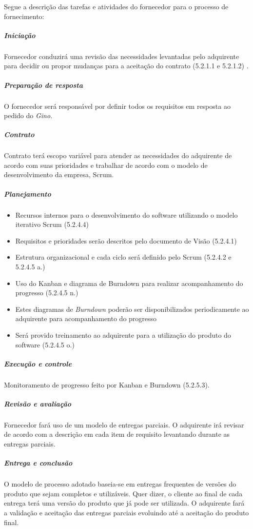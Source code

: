 Segue a descrição das tarefas e atividades do fornecedor para o processo de fornecimento:


\subparagraph{Iniciação}

Fornecedor conduzirá uma revisão das necessidades levantadas pelo adquirente para decidir ou propor mudanças para a aceitação do contrato (5.2.1.1 e 5.2.1.2) \cite{iso12207:95}.

\subparagraph{Preparação de resposta}

O fornecedor será responsável por definir todos os requisitos em resposta ao pedido do \textit{Gino}.

\subparagraph{Contrato}

Contrato terá escopo variável para atender as necessidades do adquirente de acordo com suas prioridades e trabalhar de acordo com o modelo de desenvolvimento da empresa, Scrum.

\subparagraph{Planejamento}

\begin{itemize}
  \item Recursos internos para o desenvolvimento do software utilizando o modelo iterativo Scrum (5.2.4.4)
  \item Requisitos e prioridades serão descritos pelo documento de Visão (5.2.4.1)
  \item Estrutura organizacional e cada ciclo será definido pelo Scrum (5.2.4.2 e 5.2.4.5 a.)
  \item Uso do Kanban e diagrama de Burndown para realizar acompanhamento do progresso (5.2.4.5 n.)
  \item Estes diagramas de \textit{Burndown} poderão ser disponibilizados periodicamente ao adquirente para acompanhamento do progresso
  \item Será provido treinamento ao adquirente para a utilização do produto do software (5.2.4.5 o.)
\end{itemize}

\subparagraph{Execução e controle}

Monitoramento de progresso feito por Kanban e Burndown (5.2.5.3).

\subparagraph{Revisão e avaliação}

Fornecedor fará uso de um modelo de entregas parciais. O adquirente irá revisar de acordo com a descrição em cada item de requisito levantando durante as entregas parciais. 

\subparagraph{Entrega e conclusão}

O modelo de processo adotado baseia-se em entregas frequentes de versões do produto que sejam completos e utilizáveis. Quer dizer, o cliente ao final de cada entrega terá uma versão do produto que já pode ser utilizada. O adquirente fará a validação e aceitação das entregas parciais evoluindo até a aceitação do produto final.


